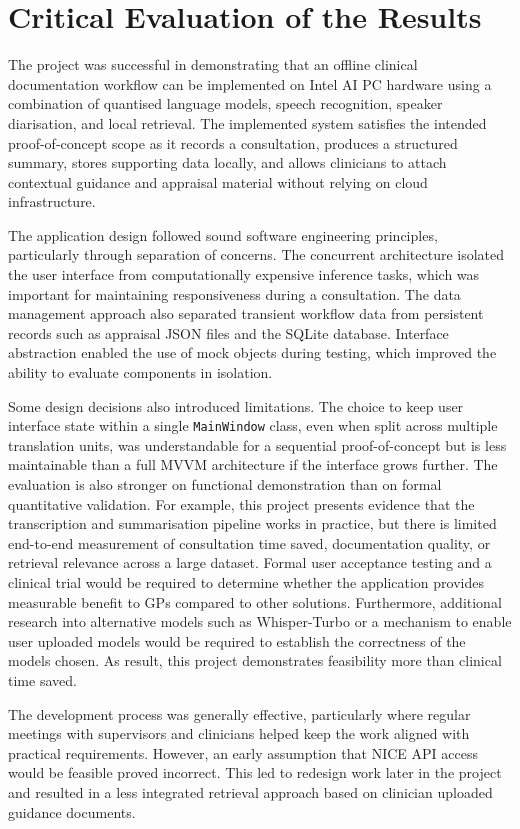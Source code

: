 \section{Critical Evaluation of the Results}
The project was successful in demonstrating that an offline clinical documentation workflow can be implemented on Intel AI PC hardware using a combination of quantised language models, speech recognition, speaker diarisation, and local retrieval. The implemented system satisfies the intended proof-of-concept scope as it records a consultation, produces a structured summary, stores supporting data locally, and allows clinicians to attach contextual guidance and appraisal material without relying on cloud infrastructure. 

The application design followed sound software engineering principles, particularly through separation of concerns. The concurrent architecture isolated the user interface from computationally expensive inference tasks, which was important for maintaining responsiveness during a consultation. The data management approach also separated transient workflow data from persistent records such as appraisal JSON files and the SQLite database. Interface abstraction enabled the use of mock objects during testing, which improved the ability to evaluate components in isolation.

Some design decisions also introduced limitations. The choice to keep user interface state within a single \texttt{MainWindow} class, even when split across multiple translation units, was understandable for a sequential proof-of-concept but is less maintainable than a full MVVM architecture if the interface grows further. The evaluation is also stronger on functional demonstration than on formal quantitative validation. For example, this project presents evidence that the transcription and summarisation pipeline works in practice, but there is limited end-to-end measurement of consultation time saved, documentation quality, or retrieval relevance across a large dataset. Formal user acceptance testing and a clinical trial would be required to determine whether the application provides measurable benefit to GPs compared to other solutions. Furthermore, additional research into alternative models such as Whisper-Turbo or a mechanism to enable user uploaded models would be required to establish the correctness of the models chosen. As result, this project demonstrates feasibility more than clinical time saved.

The development process was generally effective, particularly where regular meetings with supervisors and clinicians helped keep the work aligned with practical requirements. However, an early assumption that NICE API access would be feasible proved incorrect. This led to redesign work later in the project and resulted in a less integrated retrieval approach based on clinician uploaded guidance documents. 

